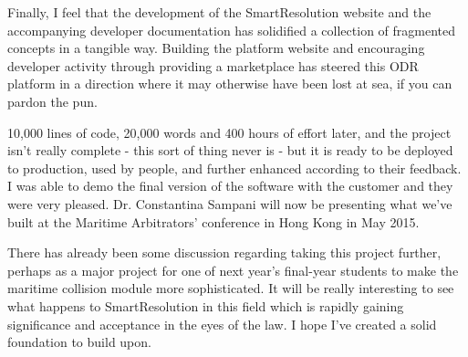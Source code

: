 Finally, I feel that the development of the SmartResolution website and the accompanying developer documentation has solidified a collection of fragmented concepts in a tangible way. Building the platform website and encouraging developer activity through providing a marketplace has steered this ODR platform in a direction where it may otherwise have been lost at sea, if you can pardon the pun.

10,000 lines of code, 20,000 words and 400 hours of effort later, and the project isn't really complete - this sort of thing never is - but it is ready to be deployed to production, used by people, and further enhanced according to their feedback. I was able to demo the final version of the software with the customer and they were very pleased. Dr. Constantina Sampani will now be presenting what we've built at the Maritime Arbitrators' conference in Hong Kong in May 2015.

There has already been some discussion regarding taking this project further, perhaps as a major project for one of next year's final-year students to make the maritime collision module more sophisticated. It will be really interesting to see what happens to SmartResolution in this field which is rapidly gaining significance and acceptance in the eyes of the law. I hope I've created a solid foundation to build upon.